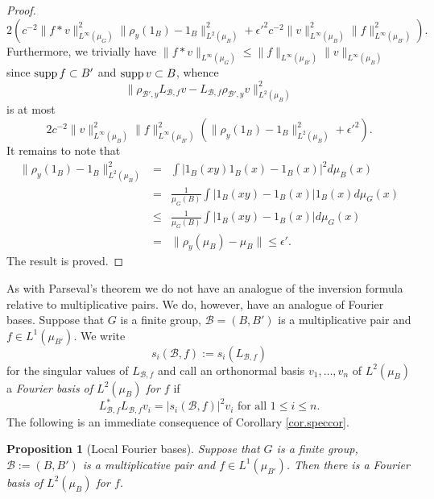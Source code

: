 \documentclass[12pt]{amsart}
\numberwithin{equation}{section}
\theoremstyle{plain}
\newtheorem{proposition}[subsection]{Proposition}
\theoremstyle{definition}
\renewcommand{\leq}{\leqslant}
\providecommand{\supp}{\mathop{\rm supp}\nolimits}
\begin{document}
\begin{proof}
\begin{equation*}
2(c^{-2}\|f \ast v\|_{L^\infty(\mu_G)}^2\|\rho_y(1_{B})-1_B\|_{L^2(\mu_B)}^2 + \epsilon'^2c^{-2} \|v\|_{L^\infty(\mu_B)}^2\|f\|_{L^\infty(\mu_{B'})}^2).
\end{equation*}
Furthermore, we trivially have $\|f \ast v\|_{L^\infty(\mu_G)} \leq \|f\|_{L^\infty(\mu_{B'})}\|v\|_{L^\infty(\mu_{B})}$ since $\supp f \subset B'$ and $\supp v \subset B$, whence
\begin{equation*}
\|\rho_{\mathcal{B}',y}L_{\mathcal{B},f}v - L_{\mathcal{B},f}\rho_{\mathcal{B}',y}v\|_{L^2(\mu_B)}^2
\end{equation*}
is at most
\begin{equation*}
2c^{-2} \|v\|_{L^\infty(\mu_B)}^2\|f\|_{L^\infty(\mu_{B'})}^2(\|\rho_y(1_{B})-1_B\|_{L^2(\mu_B)}^2 + \epsilon'^2).
\end{equation*}
It remains to note that
\begin{eqnarray*}
\|\rho_y(1_{B})-1_B\|_{L^2(\mu_B)}^2& =& \int{|1_{B}(xy)1_B(x)-1_B(x)|^2d\mu_B(x)}\\ & =&\frac{1}{\mu_G(B)} \int{|1_{B}(xy) - 1_B(x)|1_B(x)d\mu_G(x)}\\ & \leq & \frac{1}{\mu_G(B)} \int{|1_{B}(xy) - 1_B(x)|d\mu_G(x)}\\  & = & \|\rho_y(\mu_B) - \mu_B\| \leq \epsilon'.
\end{eqnarray*}
The result is proved.
\end{proof}
As with Parseval's theorem we do not have an analogue of the inversion formula relative to multiplicative pairs.  We do, however, have an analogue of Fourier bases.  Suppose that $G$ is a finite group, $\mathcal{B}=(B,B')$ is a multiplicative pair and $f \in L^1(\mu_{B'})$. We write
\begin{equation*}
s_i(\mathcal{B},f):=s_i(L_{\mathcal{B},f})
\end{equation*}
for the singular values of $L_{\mathcal{B},f}$ and call an orthonormal basis $v_1,\dots,v_n$ of $L^2(\mu_B)$ a \emph{Fourier basis of $L^2(\mu_B)$ for $f$} if
\begin{equation*}
L_{\mathcal{B},f}^*L_{\mathcal{B},f}v_i=|s_i(\mathcal{B},f)|^2v_i \textrm{ for all } 1 \leq i \leq n.
\end{equation*}
The following is an immediate consequence of Corollary \ref{cor.speccor}.
\begin{proposition}[Local Fourier bases]\label{prop.diag}
Suppose that $G$ is a finite group, $\mathcal{B}:=(B,B')$ is a multiplicative pair and $f\in L^1(\mu_{B'})$. Then there is a Fourier basis of $L^2(\mu_B)$ for $f$.
\end{proposition}
\end{document}
